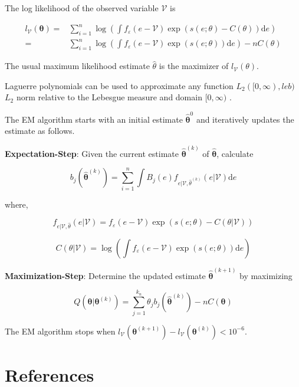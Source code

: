 \documentclass[
  12pt]{article}
\theoremstyle{definition}
\theoremstyle{remark}
\begin{document}
The log likelihood of the observed variable \(\mathcal{V}\) is

\[
\begin{aligned}
    l_{\mathcal{V}}(\mathbf{\theta})=&\sum_{i=1}^{n}\log \left(\int f_{\varepsilon}(e-\mathcal{V})\exp(s(e;\theta)-C(\theta))\text{d}e\right)\\
    =&\sum_{i=1}^{n}\log \left(\int f_{\varepsilon}(e-\mathcal{V})\exp(s(e;\theta))\text{d}e\right)-nC(\theta)
\end{aligned}
\]

The usual maximum likelihood estimate \(\hat{\theta}\) is the maximizer
of \(l_{\mathcal{V}}(\theta)\).

Laguerre polynomials can be used to approximate any function
\(L_2([0,\infty), leb)\) \(L_2\) norm relative to the Lebesgue measure
and domain \([0,\infty)\) \citep{Chen2007}.

The EM algorithm \citep{Kang2021} starts with an initial estimate
\(\hat{\mathbf{\theta}}^0\) and iteratively updates the estimate as
follows.

\textbf{Expectation-Step}: Given the current estimate
\(\hat{\mathbf{\theta}}^{(k)}\) of \(\hat{\mathbf{\theta}}\), calculate

\[
 b_j \left(\hat{\mathbf{\theta}}^{(k)}\right) = \sum_{i=1}^{n}\int B_j(e)f_{e|\mathcal{V},\hat{\theta}^{(k)}}(e|\mathcal{V})\text{d}e
\]

where,

\[
f_{e|\mathcal{V},\hat{\theta}}(e|\mathcal{V}) = f_{\varepsilon}(e-\mathcal{V})\exp(s(e;\theta)-C(\theta|\mathcal{V}))
\]

\[
C(\theta|\mathcal{V})=\log\left(\int f_{\varepsilon}(e-\mathcal{V})\exp(s(e;\theta))\text{d}e\right)
\]

\textbf{Maximization-Step}: Determine the updated estimate
\(\hat{\mathbf{\theta}}^{(k+1)}\) by maximizing

\[
Q(\mathbf{\theta}|\mathbf{\theta}^{(k)}) = \sum_{j=1}^{k_n}\theta_j b_j \left(\hat{\mathbf{\theta}}^{(k)}\right) - nC(\mathbf{\theta})
\]

The EM algorithm stops when
\(l_{\mathcal{V}}(\mathbf{\theta}^{(k+1)})-l_{\mathcal{V}}(\mathbf{\theta}^{(k)})<10^{-6}\).

\section{References}\label{references}

\renewcommand{\bibsection}{}

\end{document}
